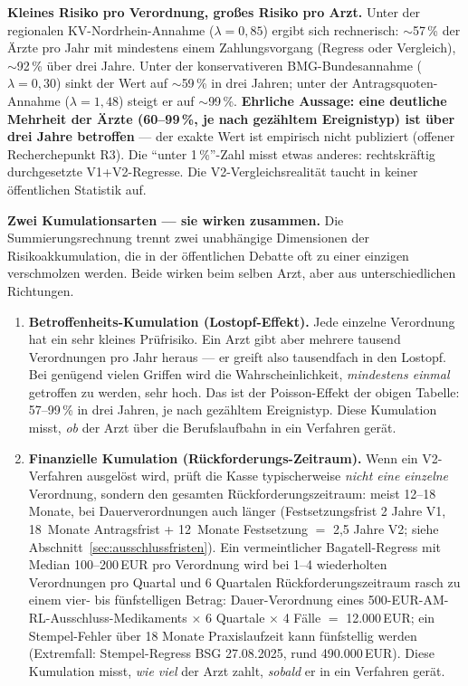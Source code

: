 \documentclass{umbruch-position}
\begin{document}
\noindent\textbf{Kleines Risiko pro Verordnung, gro\ss{}es Risiko pro Arzt.} Unter der regionalen KV-Nordrhein-Annahme ($\lambda{=}0{,}85$) ergibt sich rechnerisch: $\sim$57\,\% der \"Arzte pro Jahr mit mindestens einem Zahlungsvorgang (Regress oder Vergleich), $\sim$92\,\% \"uber drei Jahre. Unter der konservativeren BMG-Bundesannahme ($\lambda{=}0{,}30$) sinkt der Wert auf $\sim$59\,\% in drei Jahren; unter der Antragsquoten-Annahme ($\lambda{=}1{,}48$) steigt er auf $\sim$99\,\%. \textbf{Ehrliche Aussage: eine deutliche Mehrheit der \"Arzte (60--99\,\%, je nach gez\"ahltem Ereignistyp) ist \"uber drei Jahre betroffen} --- der exakte Wert ist empirisch nicht publiziert (offener Recherchepunkt R3). Die ``unter 1\,\%''-Zahl misst etwas anderes: rechtskr\"aftig durchgesetzte V1+V2-Regresse. Die V2-Vergleichsrealit\"at taucht in keiner \"offentlichen Statistik auf.

\medskip
\noindent\textbf{Zwei Kumulationsarten --- sie wirken zusammen.} Die Summierungs\-rechnung trennt zwei unabh\"angige Dimensionen der Risikoakkumulation, die in der \"offentlichen Debatte oft zu einer einzigen verschmolzen werden. Beide wirken beim selben Arzt, aber aus unterschiedlichen Richtungen.

\begin{enumerate}[nosep, leftmargin=*]
  \item \textbf{Betroffenheits-Kumulation (Lostopf-Effekt).} Jede einzelne Verordnung hat ein sehr kleines Pr\"ufrisiko. Ein Arzt gibt aber mehrere tausend Verordnungen pro Jahr heraus --- er greift also tausendfach in den \glqq{}Lostopf\grqq{}. Bei gen\"ugend vielen Griffen wird die Wahrscheinlichkeit, \textit{mindestens einmal} getroffen zu werden, sehr hoch. Das ist der Poisson-Effekt der obigen Tabelle: 57--99\,\% in drei Jahren, je nach gez\"ahltem Ereignistyp. Diese Kumulation misst, \textit{ob} der Arzt \"uber die Berufs\-laufbahn in ein Verfahren ger\"at.
  \item \textbf{Finanzielle Kumulation (R\"uckforderungs-Zeitraum).} Wenn ein V2-Verfahren ausgel\"ost wird, pr\"uft die Kasse typischerweise \textit{nicht eine einzelne} Verordnung, sondern den gesamten R\"uckforderungszeitraum: meist 12--18 Monate, bei Dauer\-verordnungen auch l\"anger (Festsetzungsfrist 2 Jahre V1, 18~Monate Antragsfrist + 12~Monate Festsetzung $=$ 2,5 Jahre V2; siehe Abschnitt~\ref{sec:ausschlussfristen}). Ein vermeintlicher \glqq{}Bagatell\grqq{}-Regress mit Median 100--200\,EUR pro Verordnung wird bei 1--4 wiederholten Verordnungen pro Quartal und 6 Quartalen R\"uckforderungszeitraum rasch zu einem vier- bis f\"unfstelligen Betrag: Dauer-Verordnung eines 500-EUR-AM-RL-Ausschluss-Medikaments $\times$ 6 Quartale $\times$ 4 F\"alle $=$ 12.000\,EUR; ein Stempel-Fehler \"uber 18 Monate Praxis\-laufzeit kann f\"unfstellig werden (Extremfall: Stempel-Regress BSG 27.08.2025, rund 490.000\,EUR). Diese Kumulation misst, \textit{wie viel} der Arzt zahlt, \textit{sobald} er in ein Verfahren ger\"at.
\end{enumerate}
\end{document}
